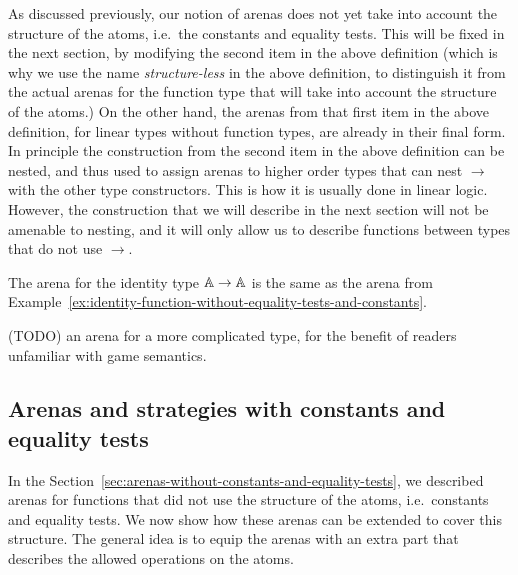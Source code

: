 As discussed previously, our notion of arenas does not yet take into account the structure of the atoms, i.e.~the constants and equality tests. This will be fixed in the next section, by modifying the second item in the above definition (which is why we use the name \emph{structure-less} in the above definition, to distinguish it from the actual arenas for the function type that will take into account the structure of the atoms.)   On the other hand, the arenas from that first item in the above definition, for linear types without function types, are already in their final form. In principle the construction from the second item in the above definition can be nested, and thus used to assign arenas to higher order types that can nest $\to$ with the other type constructors. This is how it is usually done in linear logic. However,  the construction that we will describe in the next section will not be amenable to nesting, and it will only allow us to describe functions between types that do not use $\to$.


 

\begin{example}
    The arena for the identity type $\mathbb A \to \mathbb A$ is the same as the arena from Example~\ref{ex:identity-function-without-equality-tests-and-constants}.
\end{example}

\begin{example}
    (TODO) an arena for a more complicated type, for the benefit of readers unfamiliar with game semantics.
\end{example}




\subsection{Arenas and strategies with constants and equality tests}
\label{sec:arenas-with-constants-and-equality-tests}
In the Section~\ref{sec:arenas-without-constants-and-equality-tests}, we described arenas for functions that did not use the structure of the atoms, i.e.~constants and equality tests. We now show how these arenas can be extended to cover this structure. The general idea is to equip the arenas with an extra part that describes the allowed operations on the atoms. 



